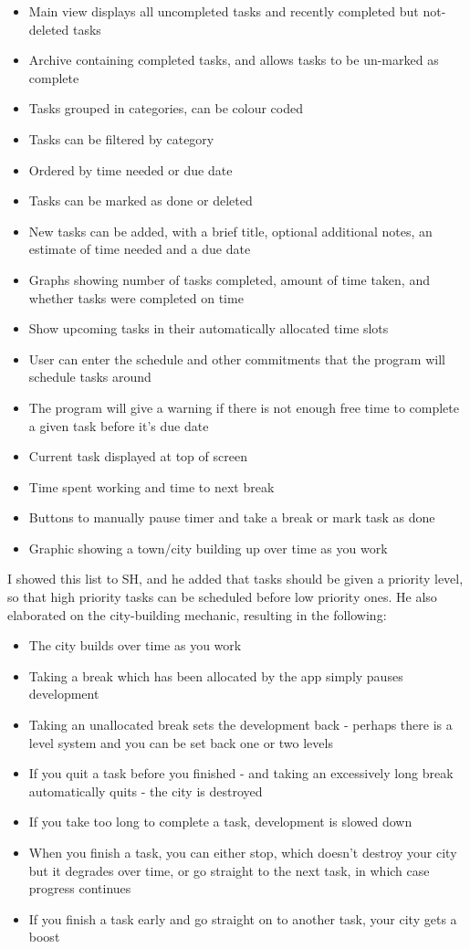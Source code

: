 \documentclass[]{article}
\begin{document}
\begin{itemize}
\item
  Main view displays all uncompleted tasks and recently completed but
  not-deleted tasks
\item
  Archive containing completed tasks, and allows tasks to be un-marked
  as complete
\item
  Tasks grouped in categories, can be colour coded
\item
  Tasks can be filtered by category
\item
  Ordered by time needed or due date
\item
  Tasks can be marked as done or deleted
\item
  New tasks can be added, with a brief title, optional additional notes,
  an estimate of time needed and a due date
\item
  Graphs showing number of tasks completed, amount of time taken, and
  whether tasks were completed on time
\item
  Show upcoming tasks in their automatically allocated time slots
\item
  User can enter the schedule and other commitments that the program
  will schedule tasks around
\item
  The program will give a warning if there is not enough free time to
  complete a given task before it's due date
\item
  Current task displayed at top of screen
\item
  Time spent working and time to next break
\item
  Buttons to manually pause timer and take a break or mark task as done
\item
  Graphic showing a town/city building up over time as you work
\end{itemize}

I showed this list to SH, and he added that tasks should be given a
priority level, so that high priority tasks can be scheduled before low
priority ones. He also elaborated on the city-building mechanic,
resulting in the following:

\begin{itemize}
\item
  The city builds over time as you work
\item
  Taking a break which has been allocated by the app simply pauses
  development
\item
  Taking an unallocated break sets the development back - perhaps there
  is a level system and you can be set back one or two levels
\item
  If you quit a task before you finished - and taking an excessively
  long break automatically quits - the city is destroyed
\item
  If you take too long to complete a task, development is slowed down
\item
  When you finish a task, you can either stop, which doesn't destroy
  your city but it degrades over time, or go straight to the next task,
  in which case progress continues
\item
  If you finish a task early and go straight on to another task, your
  city gets a boost
\end{itemize}
\end{document}
